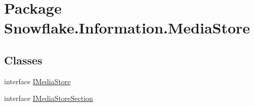 \hypertarget{namespace_snowflake_1_1_information_1_1_media_store}{}\section{Package Snowflake.\+Information.\+Media\+Store}
\label{namespace_snowflake_1_1_information_1_1_media_store}
\subsection*{Classes}
\begin{DoxyCompactItemize}
\item 
interface \hyperlink{interface_snowflake_1_1_information_1_1_media_store_1_1_i_media_store}{I\+Media\+Store}
\item 
interface \hyperlink{interface_snowflake_1_1_information_1_1_media_store_1_1_i_media_store_section}{I\+Media\+Store\+Section}
\end{DoxyCompactItemize}
